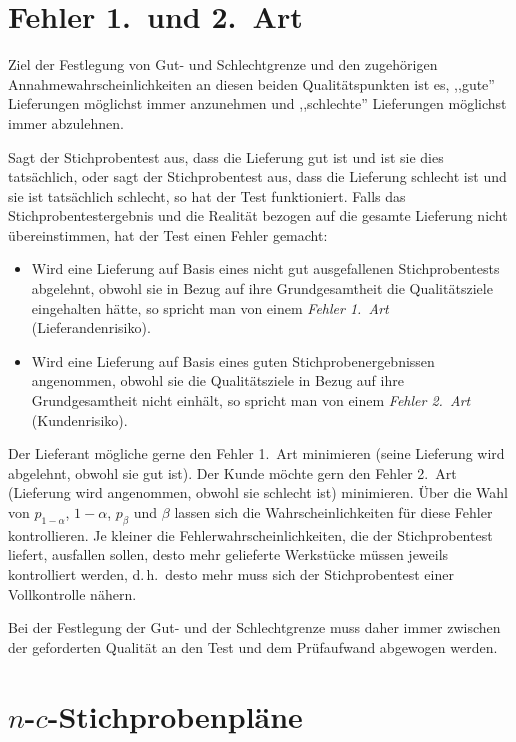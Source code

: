 \documentclass[a4paper,11pt,oneside]{article}
\begin{document}
\section{Fehler 1.\ und 2.\ Art}

Ziel der Festlegung von Gut- und Schlechtgrenze und den zugehörigen Annahmewahrscheinlichkeiten an diesen beiden Qualitätspunkten ist es, ,,gute'' Lieferungen möglichst immer anzunehmen und ,,schlechte'' Lieferungen möglichst immer abzulehnen.

Sagt der Stichprobentest aus, dass die Lieferung gut ist und ist sie dies tatsächlich, oder sagt der Stichprobentest aus, dass die Lieferung schlecht ist und sie ist tatsächlich schlecht, so hat der Test funktioniert. Falls das Stichprobentestergebnis und die Realität bezogen auf die gesamte Lieferung nicht übereinstimmen, hat der Test einen Fehler gemacht:

\begin{itemize}
\item
Wird eine Lieferung auf Basis eines nicht gut ausgefallenen Stichprobentests abgelehnt, obwohl sie in Bezug auf ihre Grundgesamtheit die Qualitätsziele eingehalten hätte, so spricht man von einem \emph{Fehler 1.\ Art} (Lieferandenrisiko).
\item
Wird eine Lieferung auf Basis eines guten Stichprobenergebnissen angenommen, obwohl sie die Qualitätsziele in Bezug auf ihre Grundgesamtheit nicht einhält, so spricht man von einem \emph{Fehler 2.\ Art} (Kundenrisiko).
\end{itemize}

Der Lieferant mögliche gerne den Fehler 1.\ Art minimieren (seine Lieferung wird abgelehnt, obwohl sie gut ist). Der Kunde möchte gern den Fehler 2.\ Art (Lieferung wird angenommen, obwohl sie schlecht ist) minimieren. Über die Wahl von $p_{1-\alpha}$, $1-\alpha$, $p_\beta$ und $\beta$ lassen sich die Wahrscheinlichkeiten für diese Fehler kontrollieren. Je kleiner die Fehlerwahrscheinlichkeiten, die der Stichprobentest liefert, ausfallen sollen, desto mehr gelieferte Werkstücke müssen jeweils kontrolliert werden, d.\,h.\ desto mehr muss sich der Stichprobentest einer Vollkontrolle nähern.

Bei der Festlegung der Gut- und der Schlechtgrenze muss daher immer zwischen der geforderten Qualität an den Test und dem Prüfaufwand abgewogen werden.



\section[n-c-Stichprobenpläne]{$n$-$c$-Stichprobenpläne}
\end{document}
